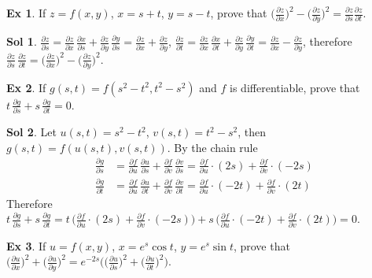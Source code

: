 \documentclass[12pt]{extarticle}
\newcommand{\ds}{\displaystyle}
\theoremstyle{definition}
\newtheorem*{ex}{Ex}
\newtheorem*{sol}{Sol}
\newcommand{\pdiff}[2]{\frac{\partial #1}{\partial #2}}
\begin{document}
\begin{ex}
  If $\ds z = f(x, y)$, $\ds x = s + t$, $\ds y = s - t$, prove that $\ds\bigg(\pdiff{z}{x}\bigg)^2 - \bigg(\pdiff{z}{y}\bigg)^2 = \pdiff{z}{s}\pdiff{z}{t}$. 
\end{ex}

\begin{sol} 
  $\ds\pdiff{z}{s} = \pdiff{z}{x}\,\pdiff{x}{s} + \pdiff{z}{y}\,\pdiff{y}{s} = \pdiff{z}{x} + \pdiff{z}{y}$, $\ds\pdiff{z}{t} = \pdiff{z}{x}\,\pdiff{x}{t} + \pdiff{z}{y}\,\pdiff{y}{t} = \pdiff{z}{x} - \pdiff{z}{y}$, therefore $\ds\pdiff{z}{s}\,\pdiff{z}{t} = \bigg(\pdiff{z}{x}\bigg)^2 - \bigg(\pdiff{z}{y}\bigg)^2$. 
\end{sol}

\begin{ex}
  If $\ds g(s, t) = f(s^2 - t^2, t^2 - s^2)$ and $f$ is differentiable, prove that $\ds t\,\pdiff{g}{s} + s\,\pdiff{g}{t} = 0$. 
\end{ex}

\begin{sol}
  Let $\ds u(s, t) = s^2 - t^2$, $\ds v(s, t) = t^2 - s^2$, then $\ds g(s, t) = f(u(s, t), v(s, t))$. By the chain rule 
  \begin{align*}
    \pdiff{g}{s} &= \pdiff{f}{u}\,\pdiff{u}{s} + \pdiff{f}{v}\,\pdiff{v}{s} = \pdiff{f}{u}\cdot(2s) + \pdiff{f}{v}\cdot(-2s) \\
    \pdiff{g}{t} &= \pdiff{f}{u}\,\pdiff{u}{t} + \pdiff{f}{v}\,\pdiff{v}{t} = \pdiff{f}{u}\cdot(-2t) + \pdiff{f}{v}\cdot(2t)
  \end{align*}
  Therefore $\ds t\,\pdiff{g}{s} + s\,\pdiff{g}{t} = t\,\bigg(\pdiff{f}{u}\cdot(2s) + \pdiff{f}{v}\cdot(-2s)\bigg) + s\,\bigg(\pdiff{f}{u}\cdot(-2t) + \pdiff{f}{v}\cdot(2t)\bigg) = 0$.  
\end{sol}

\begin{ex}
  If $\ds u = f(x, y)$, $\ds x = e^s\cos t$, $\ds y = e^s\sin t$, prove that $\ds\bigg(\pdiff{u}{x}\bigg)^2 + \bigg(\pdiff{u}{y}\bigg)^2 = e^{-2s}\bigg(\bigg(\pdiff{u}{s}\bigg)^2 + \bigg(\pdiff{u}{t}\bigg)^2\bigg)$.   
\end{ex}
\end{document}
